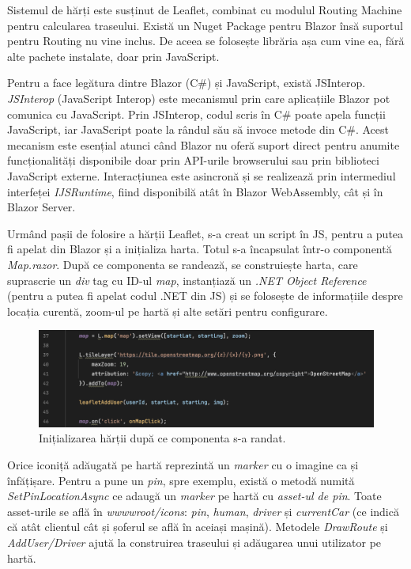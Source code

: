 Sistemul de hărți este susținut de Leaflet, combinat cu modulul Routing Machine pentru calcularea traseului.
Există un Nuget Package pentru Blazor însă suportul pentru Routing nu vine inclus. De aceea se folosește librăria așa
cum vine ea, fără alte pachete instalate, doar prin JavaScript.

Pentru a face legătura dintre Blazor (C\#) și JavaScript, există JSInterop. \textit{JSInterop}
(JavaScript Interop) este mecanismul prin care aplicațiile Blazor pot comunica cu
JavaScript. Prin JSInterop, codul scris în C\# poate apela funcții JavaScript, iar
JavaScript poate la rândul său să invoce metode din C\#. Acest mecanism este esențial
atunci când Blazor nu oferă suport direct pentru anumite funcționalități disponibile
doar prin API-urile browserului sau prin biblioteci JavaScript externe. Interacțiunea
este asincronă și se realizează prin intermediul interfeței \textit{IJSRuntime}, fiind
disponibilă atât în Blazor WebAssembly, cât și în Blazor Server. \parencite{blazor}

Urmând pașii de folosire a hărții Leaflet, s-a creat un script în JS, pentru a putea fi
apelat din Blazor și a inițializa harta. Totul s-a încapsulat într-o componentă \textit{Map.razor}.
După ce componenta se randează, se construiește harta, care suprascrie un \textit{div} tag cu ID-ul \textit{map}, instanțiază
un \textit{.NET Object Reference} (pentru a putea fi apelat codul .NET din JS) și se folosește de informațiile despre locația curentă, zoom-ul
pe hartă și alte setări pentru configurare.

\begin{figure}[H]
    \centering
    \includegraphics[width=16cm]{Assets/initLeaflet.png}
    \caption{Inițializarea hărții după ce componenta s-a randat.}
    \label{fig:initLeaflet}
\end{figure}

Orice iconiță adăugată pe hartă reprezintă un \textit{marker} cu o imagine ca și înfățișare. Pentru a pune un \textit{pin}, spre exemplu, există o metodă numită \textit{SetPinLocationAsync} ce adaugă un \textit{marker} pe hartă cu \textit{asset-ul de pin}.
Toate asset-urile se află în \textit{wwwwroot/icons}: \textit{pin}, \textit{human}, \textit{driver} și \textit{currentCar} (ce indică că atât clientul cât și șoferul se află în aceiași mașină).
Metodele \textit{DrawRoute} și \textit{AddUser/Driver} ajută la construirea traseului și adăugarea unui utilizator pe hartă.

